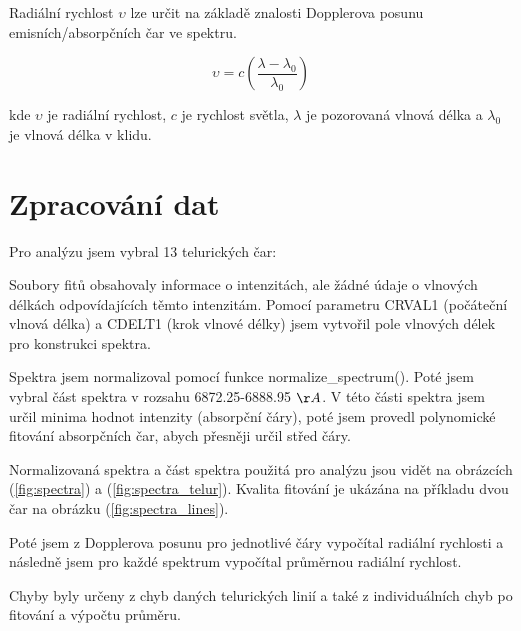 \documentclass[a4paper,11pt,twocolumn]{article}
\begin{document}
        Radiální rychlost $\upsilon$ lze určit na základě znalosti Dopplerova posunu emisních/absorpčních čar ve spektru. 

        \begin{equation}
            \upsilon = c \left( \frac{\lambda - \lambda_0}{\lambda_0} \right) 
        \end{equation}

        kde $\upsilon$ je radiální rychlost, $c$ je rychlost světla, $\lambda$ je pozorovaná vlnová délka a $\lambda_0$ je vlnová délka v klidu.
        
    \section{Zpracování dat}
        Pro analýzu jsem vybral 13 telurických čar:


        \vspace{10pt}

        Soubory fitů obsahovaly informace o intenzitách, ale žádné údaje o vlnových délkách odpovídajících těmto intenzitám. Pomocí parametru CRVAL1 (počáteční vlnová délka) a CDELT1 (krok vlnové délky) jsem vytvořil pole vlnových délek pro konstrukci spektra. 

        Spektra jsem normalizoval pomocí funkce normalize\_spectrum(). Poté jsem vybral část spektra v rozsahu 6872.25-6888.95 $\AA$. V této části spektra jsem určil minima hodnot intenzity (absorpční čáry), poté jsem provedl polynomické fitování absorpčních čar, abych přesněji určil střed čáry. 

        Normalizovaná spektra a část spektra použitá pro analýzu jsou vidět na obrázcích (\ref{fig:spectra}) a (\ref{fig:spectra_telur}). Kvalita fitování je ukázána na příkladu dvou čar na obrázku (\ref{fig:spectra_lines}).

        Poté jsem z Dopplerova posunu pro jednotlivé čáry vypočítal radiální rychlosti a následně jsem pro každé spektrum vypočítal průměrnou radiální rychlost.

        Chyby byly určeny z chyb daných telurických linií a také z individuálních chyb po fitování a výpočtu průměru. 
\end{document}
